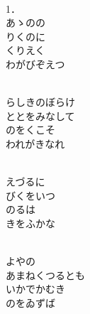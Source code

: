 \documentclass[10pt,b5j]{tarticle} %
\begin{document}
\vspace{1.5em} %
\newcommand{\linespace}{0.5em} %
\newcommand{\blocksize}{0.5\hsize} %
\newcommand{\itemmargin}{6em} %
\begin{enumerate} %
    \setlength{\itemindent}{\itemmargin} %
    \begin{minipage}[c]{\blocksize}
    
        \vspace{\linespace}
        \item~\\
        1．\\
        あゝのの\\
        りくのに\\
        くりえく\\
        わがびぞえつ
        
        \vspace{\linespace}
        \item~\\
        らしきのぼらけ\\
        ととをみなして\\
        のをくこそ\\
        われがきなれ
        
        \vspace{\linespace}
        \item~\\
        えづるに\\
        びくをいつ\\
        のるは\\
        きをふかな
        
        \vspace{\linespace}
        \item~\\
        よやの\\
        あまねくつるとも\\
        いかでかむき\\
        のをゐずば
        

\end{minipage}
\end{enumerate}
\end{document}
